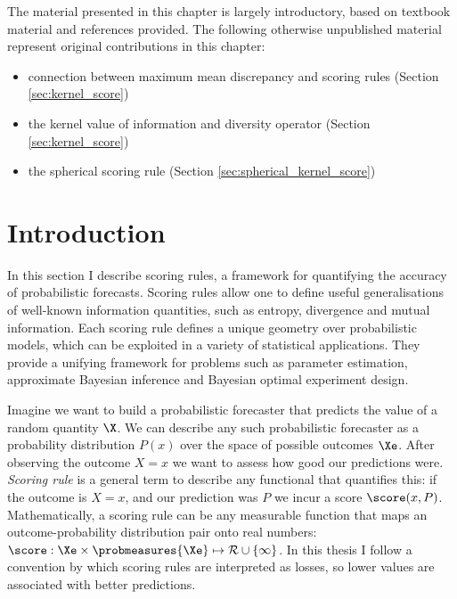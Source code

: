 
\begin{summarycontributions}
The material presented in this chapter is largely introductory, based on textbook material and references provided. The following otherwise unpublished material represent original contributions in this chapter:
\begin{itemize}[noitemsep,topsep=0pt,parsep=0pt,partopsep=0pt]
	\item connection between maximum mean discrepancy and scoring rules (Section \ref{sec:kernel_score})
	\item the kernel value of information and diversity operator (Section \ref{sec:kernel_score})
	\item the spherical scoring rule (Section \ref{sec:spherical_kernel_score})
\end{itemize}
\end{summarycontributions}
\section{Introduction}

In this section I describe scoring rules, a framework for quantifying the accuracy of probabilistic forecasts. Scoring rules allow one to define useful generalisations of well-known information quantities, such as entropy, divergence and mutual information. Each scoring rule defines a unique geometry over probabilistic models, which can be exploited in a variety of statistical applications. They provide a unifying framework for problems such as parameter estimation, approximate Bayesian inference and Bayesian optimal experiment design.

Imagine we want to build a probabilistic forecaster that predicts the value of a random quantity $\X$. We can describe any such probabilistic forecaster as a probability distribution $P(x)$ over the space of possible outcomes $\Xe$. After observing the outcome $X=x$ we want to assess how good our predictions were. \emph{Scoring rule} is a general term to describe any functional that quantifies this: if the outcome is $X=x$, and our prediction was $P$ we incur a score $\score (x,P)$.  Mathematically, a scoring rule can be any measurable function that maps an outcome-probability distribution pair onto real numbers: $\score:\Xe\times\probmeasures{\Xe}\mapsto\mathcal{R}\cup\{\infty\}$. In this thesis I follow a convention by which scoring rules are interpreted as losses, so lower values are associated with better predictions.

